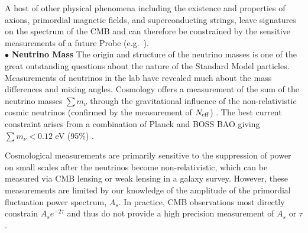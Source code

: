 \documentclass[PICOReport.tex]{subfiles}
\begin{document}
A host of other physical phenomena including the existence and properties of axions, primordial magnetic fields, and 
superconducting strings, leave signatures on the spectrum of the CMB and can therefore be constrained by 
the sensitive measurements  of a future Probe (e.g.~\cite{Jedamzik2000, Tashiro2012, Dolgov2013, Tashiro2013, Caldwell2013}).
\\
 $\bullet$ {\bf Neutrino Mass} \hspace{0.1in} The origin and structure of the neutrino masses is one of the great outstanding 
 questions about the nature of the Standard Model particles.  Measurements of neutrinos in the lab have revealed much 
 about the mass differences and mixing angles.  Cosmology offers a 
 measurement of the sum of the neutrino masses $\sum m_\nu$ through the gravitational influence of the non-relativistic 
 cosmic neutrinos (confirmed by the measurement of ${N_{\rm eff}}$) .  
 The best current constraint arises from a combination of 
 Planck and BOSS \ac{BAO} giving $\sum m_\nu < 0.12$ eV (95\%) .

Cosmological measurements are primarily sensitive to the suppression of power on small scales after the neutrinos become 
non-relativistic, which can be measured via CMB lensing or weak lensing in a galaxy survey.  However, these measurements are 
limited by our knowledge of the amplitude of the primordial fluctuation power spectrum, $A_s$.  In practice, CMB observations most 
directly constrain $A_s e^{-2 \tau}$ 
and thus do not provide a high precision measurement of $A_s$ or $\tau$.  

\end{document}
